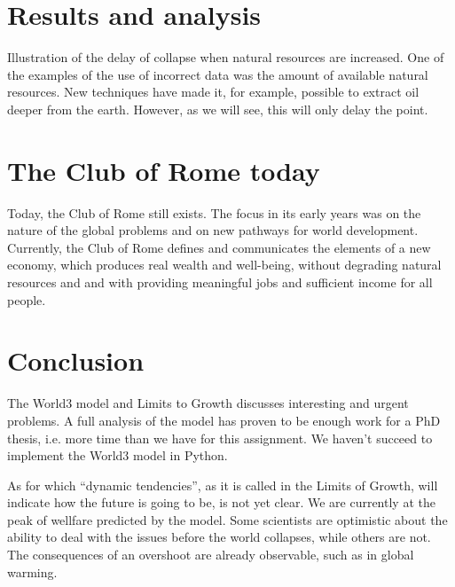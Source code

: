 \documentclass[10pt,a4paper]{scrartcl}
\begin{document}
\section*{Results and analysis}

Illustration of the delay of collapse when natural resources are increased. One of the examples of the use of incorrect data was the amount of available natural resources. New techniques have made it, for example, possible to extract oil deeper from the earth. However, as we will see, this will only delay the point.

\section*{The Club of Rome today}

Today, the Club of Rome still exists. The focus in its early years was on the nature of the global problems and on new pathways for world development. Currently, the Club of Rome defines and communicates the elements of a new economy, which produces real wealth and well-being, without degrading natural resources and and with providing meaningful jobs and sufficient income for all people.

\section*{Conclusion}

The World3 model and Limits to Growth discusses interesting and urgent problems. A full analysis of the model has proven to be enough work for a PhD thesis, i.e. more time than we have for this assignment. We haven't succeed to implement the World3 model in Python.

As for which ``dynamic tendencies'', as it is called in the Limits of Growth, will indicate how the future is going to be, is not yet clear. We are currently at the peak of wellfare predicted by the model. Some scientists are optimistic about the ability to deal with the issues before the world collapses, while others are not. The consequences of an overshoot are already observable, such as in global warming.


\nocite{*}

\end{document}

